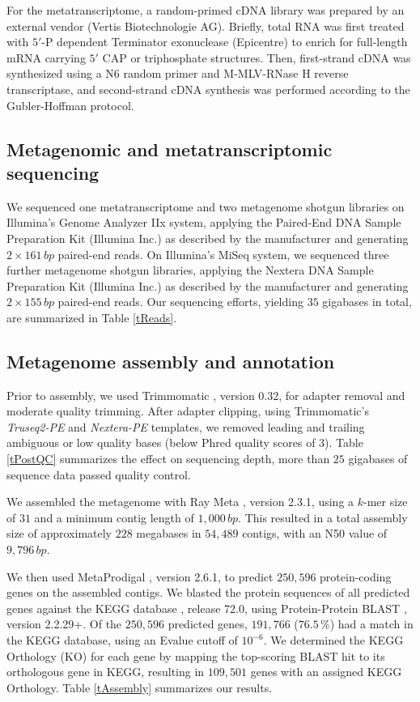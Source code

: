 \documentclass{bmcart}
\begin{document}
For the metatranscriptome, a random-primed cDNA library was prepared by an external vendor (Vertis Biotechnologie AG). Briefly, total RNA was first treated with $5'$-P dependent Terminator exonuclease (Epicentre) to enrich for full-length mRNA carrying $5'$ CAP or triphosphate structures. Then, first-strand cDNA was synthesized using a N6 random primer and M-MLV-RNase H reverse transcriptase, and second-strand cDNA synthesis was performed according to the Gubler-Hoffman protocol.

\subsection*{Metagenomic and metatranscriptomic sequencing}
We sequenced one metatranscriptome and two metagenome shotgun libraries on Illumina's Genome Analyzer IIx system, applying the Paired-End DNA Sample Preparation Kit (Illumina Inc.) as described by the manufacturer and generating $2 \times 161\,bp$ paired-end reads.
On Illumina's MiSeq system, we sequenced three further metagenome shotgun libraries, applying the Nextera DNA Sample Preparation Kit (Illumina Inc.) as described by the manufacturer and generating $2 \times 155\,bp$ paired-end reads.
Our sequencing efforts, yielding $35$ gigabases in total, are summarized in Table \ref{tReads}.

\subsection*{Metagenome assembly and annotation}
Prior to assembly, we used Trimmomatic \cite{Trimmomatic}, version 0.32, for adapter removal and moderate quality trimming.
After adapter clipping, using Trimmomatic's \emph{Truseq2-PE} and \emph{Nextera-PE} templates, we removed leading and trailing ambiguous or low quality bases (below Phred quality scores of 3).
Table \ref{tPostQC} summarizes the effect on sequencing depth, more than $25$ gigabases of sequence data passed quality control.

We assembled the metagenome with Ray Meta \cite{RayMeta}, version 2.3.1, using a $k$-mer size of $31$ and a minimum contig length of $1,000\,bp$.
This resulted in a total assembly size of approximately $228$ megabases in $54,489$ contigs, with an N50 value of $9,796\,bp$. %

We then used MetaProdigal \cite{MetaProdigal}, version 2.6.1, to predict $250,596$ protein-coding genes on the assembled contigs. We blasted the protein sequences of all predicted genes against the KEGG database \cite{KeggDB}, release 72.0, using Protein-Protein BLAST \cite{BlastPlus}, version 2.2.29+. 
Of the $250,596$ predicted genes, $191,766$ ($76.5\,\%$) had a match in the KEGG database, using an Evalue cutoff of $10^{-6}$.
We determined the KEGG Orthology (KO) for each gene by mapping the top-scoring BLAST hit to its orthologous gene in KEGG, resulting in $109,501$ genes with an assigned KEGG Orthology.
Table \ref{tAssembly} summarizes our results.
\end{document}
